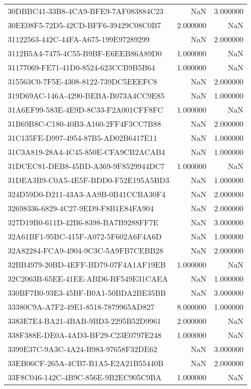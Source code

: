 \begin{tabular}{lrr}
30DBBC41-33B8-4CA9-BFE9-7AF083884C23 & NaN & 3.000000 \\
30EE08F5-72D5-42CD-BFF6-39429C08C0B7 & 2.000000 & NaN \\
31122563-442C-44FA-A675-199E97289299 & NaN & 2.000000 \\
3112B5A4-7475-4C55-B9BF-E6EEB86A89D0 & 1.000000 & NaN \\
31177069-FE71-41D0-8524-623CCB9B5B64 & 1.000000 & NaN \\
315563C0-7F5E-4308-8122-739DC5EEEFC8 & NaN & 2.000000 \\
319D69AC-146A-4290-BEBA-B073A4CC9E85 & NaN & 1.000000 \\
31A6EF99-583E-4E9D-8C33-F2A001CFF8FC & 1.000000 & NaN \\
31B69B8C-C180-40B3-A160-2FF4F3CC7B88 & NaN & 2.000000 \\
31C135FE-D997-4954-87B5-AD02B6417E11 & NaN & 1.000000 \\
31C3A819-28A4-4C45-850E-CFA9CB2ACAB4 & NaN & 1.000000 \\
31DCEC81-DEB8-45BD-A369-9F8529944DC7 & 1.000000 & NaN \\
31DEA3B9-C0A5-4E5F-BDD0-F52E195A5BD3 & NaN & 1.000000 \\
324D59D0-D211-43A3-AA9B-0B41CCBA30F4 & NaN & 2.000000 \\
32698336-6829-4C27-9ED9-F8B1E84FA904 & NaN & 2.000000 \\
327D19B0-611D-42B6-8398-BA7B9288FF7E & NaN & 3.000000 \\
32A61BF1-95BC-415F-A072-5F602A6F4A6D & NaN & 1.000000 \\
32A82284-FCA9-4904-9C3C-5A9FB7CEBB28 & NaN & 2.000000 \\
32BB4979-20BD-4EFF-BD79-07F4A1AF19EB & 1.000000 & NaN \\
32C2063B-65EE-41EE-ABD6-BF549E31CAEA & NaN & 1.000000 \\
330BF7B0-93E3-45BF-B0A1-50BDA2BE35BB & NaN & 3.000000 \\
33380C9A-A7F2-49E1-8518-7879965AD827 & 8.000000 & 1.000000 \\
3383E7E4-BA21-4BAB-9BD3-2295B52D9961 & 2.000000 & NaN \\
338F388E-DE0A-4AD3-BF29-C23E0797E248 & 1.000000 & NaN \\
3399E37C-9A3C-4A24-B983-97658F32DE62 & NaN & 3.000000 \\
33EB06CF-265A-4CB7-B1A5-E2A21B55440B & NaN & 2.000000 \\
33F8C046-142C-4B9C-856E-9B2EC905C9BA & 1.000000 & NaN \\

\end{tabular}
